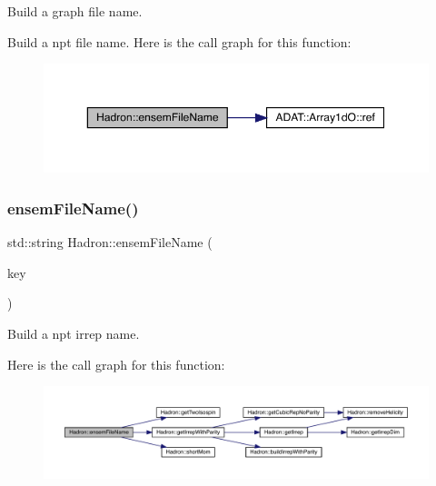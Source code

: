 Build a graph file name. 

Build a npt file name. Here is the call graph for this function\+:\nopagebreak
\begin{figure}[H]
\begin{center}
\leavevmode
\includegraphics[width=350pt]{d1/daf/namespaceHadron_a427c61121d387abc689b090161709921_cgraph}
\end{center}
\end{figure}
\mbox{\label{namespaceHadron_a21a0c1cea8de6f0c457f10e22cd3d251}} 
\subsubsection{\texorpdfstring{ensemFileName()}{ensemFileName()}\hspace{0.1cm}{\footnotesize\ttfamily [6/12]}}
{\footnotesize\ttfamily std\+::string Hadron\+::ensem\+File\+Name (\begin{DoxyParamCaption}\item[{const \mbox{\hyperlink{structHadron_1_1KeyHadronNPartIrrep__t}{Hadron\+::\+Key\+Hadron\+N\+Part\+Irrep\+\_\+t}} \&}]{key }\end{DoxyParamCaption})}



Build a npt irrep name. 

Here is the call graph for this function\+:\nopagebreak
\begin{figure}[H]
\begin{center}
\leavevmode
\includegraphics[width=350pt]{d1/daf/namespaceHadron_a21a0c1cea8de6f0c457f10e22cd3d251_cgraph}
\end{center}
\end{figure}
\mbox{\label{namespaceHadron_ac1f8513c22ed958fc79537d0cfc00e1f}} 
